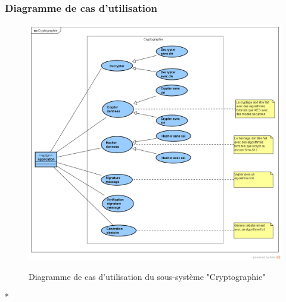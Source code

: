 \subsubsection{Diagramme de cas d'utilisation}
\begin{figure}[H]
	\centering
	\begin{minipage}{12cm}
		\centering
		{\includegraphics[height=0.35\textheight, width=1\textwidth]{fig/Cryptographie-use-case-diagram.png}}
	\end{minipage}
	\caption{Diagramme de cas d'utilisation du sous-système "Cryptographie"}
	\label{fig:7.14}
\end{figure}
*%

